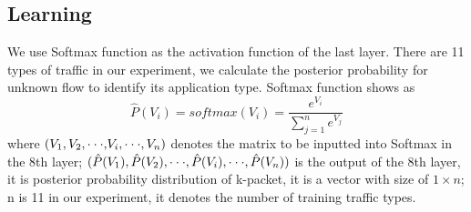 \documentclass[conference]{IEEEtran}
\begin{document}


\subsection{Learning}
We use Softmax function as the activation function of the last layer. There are 11 types of traffic in our experiment, we calculate the posterior probability for unknown flow to identify its application type. Softmax function shows as
\begin{equation}
\hat P({V_i}) = softmax({V_i}) = \frac{{{e^{{V_i}}}}}{{\sum\limits_{j = 1}^n {{e^{{V_j}}}} }}
\end{equation}
where $({V_1},{V_2},{\rm{\cdot\cdot\cdot,}}{V_i},{\rm{\cdot\cdot\cdot}},{V_n})$ denotes the matrix to be inputted into Softmax in the 8th layer; $(\hat P({V_1}),\hat P({V_2}),{\rm{\cdot\cdot\cdot}},\hat P({V_i}),{\rm{\cdot\cdot\cdot}},\hat P({V_n}))$ is the output of the 8th layer, it is posterior probability distribution of k-packet, it is a vector with size of $1 \times n$; n is 11 in our experiment, it denotes the number of training traffic types.
\end{document}
